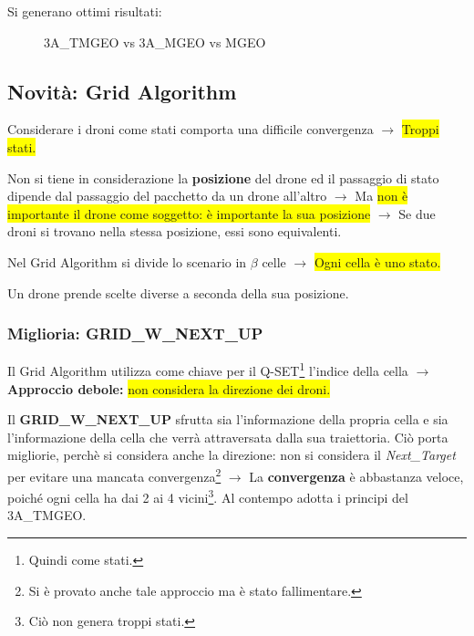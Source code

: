 \documentclass[12pt]{article}
\begin{document}
Si generano ottimi risultati: 

\begin{figure}[H]
    
    \qquad
    \caption{3A\_TMGEO vs 3A\_MGEO vs MGEO}%
    \label{fig:example}%
\end{figure}


\subsection{Novità: \textbf{Grid Algorithm}}

Considerare i droni come stati comporta una difficile convergenza $\rightarrow$ \colorbox{yellow}{Troppi stati.} 

Non si tiene in considerazione la \textbf{posizione} del drone ed il passaggio di stato dipende dal passaggio del pacchetto da un drone all'altro $\rightarrow$ Ma \colorbox{yellow}{non è importante il drone come soggetto: è importante la sua posizione} $\rightarrow$ Se due droni si trovano nella stessa posizione, essi sono equivalenti.

Nel Grid Algorithm si divide lo scenario in $\beta$ celle $\rightarrow$ \colorbox{yellow}{Ogni cella è uno stato.}

Un drone prende scelte diverse a seconda della sua posizione.

\subsubsection{Miglioria: \textbf{GRID\_W\_NEXT\_UP}}

Il Grid Algorithm utilizza come chiave per il Q-SET\footnote{Quindi come stati.} l'indice della cella $\rightarrow$ \textbf{Approccio debole:} \colorbox{yellow}{non considera la direzione dei droni.}

Il \textbf{GRID\_W\_NEXT\_UP} sfrutta sia l'informazione della propria cella e sia l'informazione della cella che verrà attraversata dalla sua traiettoria. Ciò porta migliorie, perchè si considera anche la direzione: non si considera il \textit{Next\_Target} per evitare una mancata convergenza\footnote{Si è provato anche tale approccio ma è stato fallimentare.} $\rightarrow$ La \textbf{convergenza} è abbastanza veloce, poiché ogni cella ha dai 2 ai 4 vicini\footnote{Ciò non genera troppi stati.}. Al contempo adotta i principi del 3A\_TMGEO.
\end{document}
